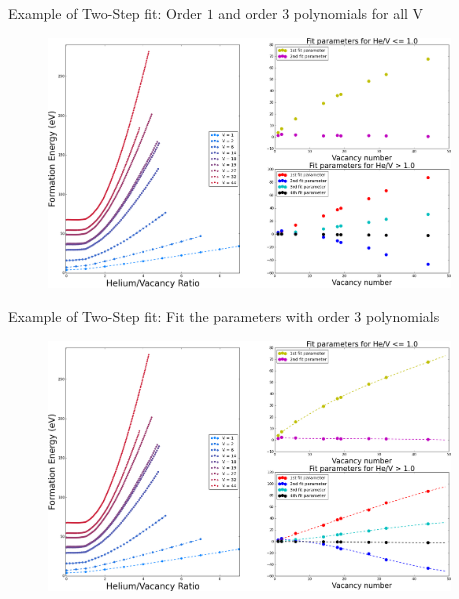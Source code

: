 \documentclass[10pt]{beamer}
\begin{document}
\begin{frame}{Example of Two-Step fit:}
	Order $1$ and order $3$ polynomials for all V
	\begin{figure}
        \includegraphics[width=0.95\textwidth]{fit1DS3}
    \end{figure}
\end{frame}

\begin{frame}{Example of Two-Step fit:}
	Fit the parameters with order $3$ polynomials
	\begin{figure}
        \includegraphics[width=0.95\textwidth]{fit1DS4}
    \end{figure}
\end{frame}
\end{document}
